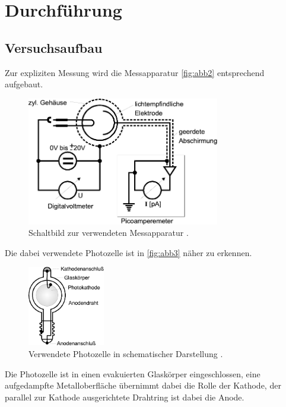 \section{Durchführung}
\label{sec:Durchführung}

\subsection{Versuchsaufbau}

Zur expliziten Messung wird die Messapparatur \autoref{fig:abb2} entsprechend aufgebaut.

\begin{figure}[H]
    \centering
    \includegraphics[width=0.75\textwidth]{figures/Abb2.pdf}
    \caption{Schaltbild zur verwendeten Messapparatur \cite{ap10}.}
    \label{fig:abb2}
\end{figure}

Die dabei verwendete Photozelle ist in \autoref{fig:abb3} näher zu erkennen.

\begin{figure}[H]
    \centering
    \includegraphics[width=0.3\textwidth]{figures/Abb3.pdf}
    \caption{Verwendete Photozelle in schematischer Darstellung \cite{ap10}.}
    \label{fig:abb3}
\end{figure}

Die Photozelle ist in einen evakuierten Glaskörper eingeschlossen, eine aufgedampfte Metalloberfläche übernimmt dabei die Rolle der Kathode, der parallel zur Kathode ausgerichtete Drahtring ist dabei die Anode. \\

